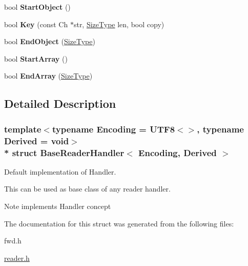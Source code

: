 \begin{DoxyCompactItemize}
\item 
bool {\bfseries Start\+Object} ()\hypertarget{a00045_ab0a7d9bcececb8d6ed748656f67f4917}{}\label{a00045_ab0a7d9bcececb8d6ed748656f67f4917}

\item 
bool {\bfseries Key} (const Ch $\ast$str, \hyperlink{a00677_a5ed6e6e67250fadbd041127e6386dcb5}{Size\+Type} len, bool copy)\hypertarget{a00045_abc50b2e7e411b7b731715e05cd01e2eb}{}\label{a00045_abc50b2e7e411b7b731715e05cd01e2eb}

\item 
bool {\bfseries End\+Object} (\hyperlink{a00677_a5ed6e6e67250fadbd041127e6386dcb5}{Size\+Type})\hypertarget{a00045_a0406cee0af26bc3a0b7fb2414537b0ab}{}\label{a00045_a0406cee0af26bc3a0b7fb2414537b0ab}

\item 
bool {\bfseries Start\+Array} ()\hypertarget{a00045_a9dbb1143a250a904bb18a174553a3a00}{}\label{a00045_a9dbb1143a250a904bb18a174553a3a00}

\item 
bool {\bfseries End\+Array} (\hyperlink{a00677_a5ed6e6e67250fadbd041127e6386dcb5}{Size\+Type})\hypertarget{a00045_ae9d60a8779b6a77a7f283d64961879fb}{}\label{a00045_ae9d60a8779b6a77a7f283d64961879fb}

\end{DoxyCompactItemize}


\subsection{Detailed Description}
\subsubsection*{template$<$typename Encoding = U\+T\+F8$<$$>$, typename Derived = void$>$\\*
struct Base\+Reader\+Handler$<$ Encoding, Derived $>$}

Default implementation of Handler. 

This can be used as base class of any reader handler. \begin{DoxyNote}{Note}
implements Handler concept 
\end{DoxyNote}


The documentation for this struct was generated from the following files\+:\begin{DoxyCompactItemize}
\item 
fwd.\+h\item 
\hyperlink{a00683}{reader.\+h}\end{DoxyCompactItemize}
